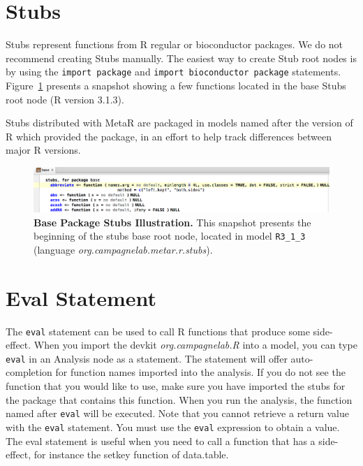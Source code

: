 \section{Stubs}\label{sec:Stubs}
Stubs represent functions from R regular or bioconductor packages. We do not recommend creating Stubs manually. The easiest way to create Stub root nodes is by using the \texttt{import package} and \texttt{import bioconductor package} statements. Figure~\ref{fig:StubsExample} presents a snapshot showing a few functions located in the base Stubs root node (R version 3.1.3).
\begin{remark}
Stubs distributed with MetaR are packaged in models named after the version of R which provided the package, in an effort to help track differences between major R versions.
\end{remark}


\begin{figure}[h!tbp]
  \centering
  \includegraphics[width=\figWidthWide]{figures/BaseStubsSnapshot.png}
\caption[Base Package Stubs Illustration.]{\textbf{Base Package Stubs Illustration.}  This snapshot presents the beginning of the stubs base root node, located in model \texttt{R3\_1\_3} (language \textit{org\allowbreak{}.campagnelab\allowbreak{}.metar\allowbreak{}.r\allowbreak{}.stubs}).}
\label{fig:StubsExample}
\end{figure}

\section{Eval Statement}\label{sec:EvalStatement}
The \texttt{eval} statement can be used to call R functions that produce some side-effect. When you import the devkit \textit{org.campagnelab.R} into a model, you can type \texttt{eval} in an Analysis node as a statement. The statement will offer auto-completion for function names imported into the analysis. If you do not see the function that you would like to use, make sure you have imported the stubs for the package that contains this function. When you run the analysis, the function named after \texttt{eval} will be executed. Note that you cannot retrieve a return value with the \texttt{eval} statement. You must use the \texttt{eval} expression to obtain a value. The eval statement is useful when you need to call a function that has a side-effect, for instance the setkey function of data.table.


